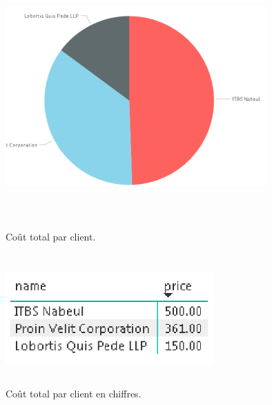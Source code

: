 \begin{itemize}
\begin{figure}[H]
\end{figure}
\FloatBarrier

\FloatBarrier
\begin{figure}[H]
\center
\includegraphics[width=10cm,height=10cm]{./figures/rpb3.png}
\caption{Co\^{u}t total par client.}

\end{figure}
\FloatBarrier

\FloatBarrier
\begin{figure}[H]
\center
\includegraphics[width=8cm,height=5cm]{./figures/rpb31.png}
\caption{Co\^{u}t total par client en chiffres.}

\end{figure}
\FloatBarrier



\newpage


\end{itemize}

